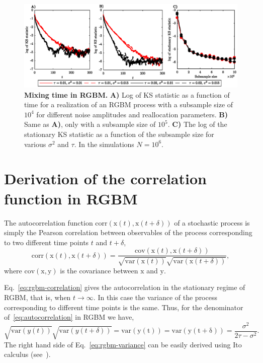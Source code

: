 \documentclass[11pt]{article}
\newcommand{\be}{\begin{equation}}
\newcommand{\ee}{\end{equation}}
\numberwithin{equation}{section}
\begin{document}
\begin{figure}[!htb]
\centering
\includegraphics[width=1.0\textwidth]{figs/fig_mixing_time_rgbm.eps}
\caption{\textbf{Mixing time in RGBM.} \textbf{A)} Log of KS statistic as a function of time for a realization of an RGBM process with a subsample size of $10^4$ for different noise amplitudes and reallocation parameters. \textbf{B)} Same as \textbf{A)}, only with a subsample size of $10^5$. \textbf{C)} The log of the stationary KS statistic as a function of the subsample size for various $\sigma^2$ and $\tau$. In the simulations $N = 10^6$. \label{fig:rgbm-mixing-time}}
\end{figure}

\section{Derivation of the correlation function in RGBM}\label{sec:rgbm-correlation-function}

The autocorrelation function $\mathrm{corr}(\mathrm{x}(t), \mathrm{x}(t+\delta))$ of a stochastic process is simply the Pearson correlation between observables of the process corresponding to two different time points $t$ and $t+\delta$, 
\be
    \mathrm{corr}(\mathrm{x}(t), \mathrm{x}(t+\delta)) = \frac{\mathrm{cov}(\mathrm{x}(t), \mathrm{x}(t+\delta))}{\sqrt{\mathrm{var}(\mathrm{x}(t))} \sqrt{\mathrm{var}(\mathrm{x}(t+\delta))}},
    \label{eq:autocorrelation}
\ee
where $\mathrm{cov}(\mathrm{x}, \mathrm{y})$ is the covariance between $\mathrm{x}$ and $\mathrm{y}$.

Eq.~\eqref{eq:rgbm-correlation} gives the autocorrelation in the stationary regime of RGBM, that is, when $t \to \infty$. In this case the variance of the process corresponding to different time points is the same. Thus, for the denominator of~\eqref{eq:autocorrelation} in RGBM we have,
\be
   \sqrt{\mathrm{var}(y(t))} \sqrt{\mathrm{var}(y(t+\delta))} = \mathrm{var(y(t))} = \mathrm{var(y(t+\delta))} = \frac{\sigma^2}{2\tau - \sigma^2}.
    \label{eq:rgbm-variance}
\ee
The right hand side of Eq.~\eqref{eq:rgbm-variance} can be easily derived using Ito calculus (see~\citet{BermanPetersAdamou2019}).
\end{document}
